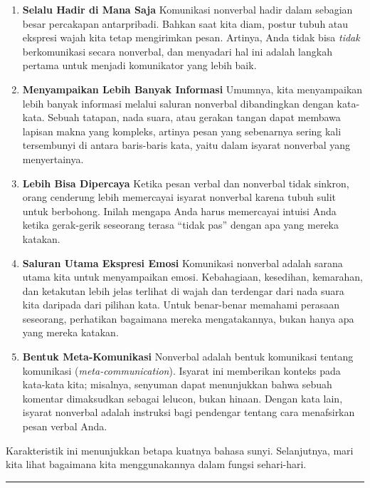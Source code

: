 \documentclass[
  letterpaper,
  DIV=11,
  numbers=noendperiod]{scrreprt}
\begin{document}
\begin{enumerate}
\def\labelenumi{\arabic{enumi}.}
\item
  \textbf{Selalu Hadir di Mana Saja} Komunikasi nonverbal hadir dalam
  sebagian besar percakapan antarpribadi. Bahkan saat kita diam, postur
  tubuh atau ekspresi wajah kita tetap mengirimkan pesan. Artinya, Anda
  tidak bisa \emph{tidak} berkomunikasi secara nonverbal, dan menyadari
  hal ini adalah langkah pertama untuk menjadi komunikator yang lebih
  baik.
\item
  \textbf{Menyampaikan Lebih Banyak Informasi} Umumnya, kita
  menyampaikan lebih banyak informasi melalui saluran nonverbal
  dibandingkan dengan kata-kata. Sebuah tatapan, nada suara, atau
  gerakan tangan dapat membawa lapisan makna yang kompleks, artinya
  pesan yang sebenarnya sering kali tersembunyi di antara baris-baris
  kata, yaitu dalam isyarat nonverbal yang menyertainya.
\item
  \textbf{Lebih Bisa Dipercaya} Ketika pesan verbal dan nonverbal tidak
  sinkron, orang cenderung lebih memercayai isyarat nonverbal karena
  tubuh sulit untuk berbohong. Inilah mengapa Anda harus memercayai
  intuisi Anda ketika gerak-gerik seseorang terasa ``tidak pas'' dengan
  apa yang mereka katakan.
\item
  \textbf{Saluran Utama Ekspresi Emosi} Komunikasi nonverbal adalah
  sarana utama kita untuk menyampaikan emosi. Kebahagiaan, kesedihan,
  kemarahan, dan ketakutan lebih jelas terlihat di wajah dan terdengar
  dari nada suara kita daripada dari pilihan kata. Untuk benar-benar
  memahami perasaan seseorang, perhatikan bagaimana mereka
  mengatakannya, bukan hanya apa yang mereka katakan.
\item
  \textbf{Bentuk Meta-Komunikasi} Nonverbal adalah bentuk komunikasi
  tentang komunikasi (\emph{meta-communication}). Isyarat ini memberikan
  konteks pada kata-kata kita; misalnya, senyuman dapat menunjukkan
  bahwa sebuah komentar dimaksudkan sebagai lelucon, bukan hinaan.
  Dengan kata lain, isyarat nonverbal adalah instruksi bagi pendengar
  tentang cara menafsirkan pesan verbal Anda.
\end{enumerate}

Karakteristik ini menunjukkan betapa kuatnya bahasa sunyi. Selanjutnya,
mari kita lihat bagaimana kita menggunakannya dalam fungsi sehari-hari.

\begin{center}\rule{0.5\linewidth}{0.5pt}\end{center}
\end{document}
